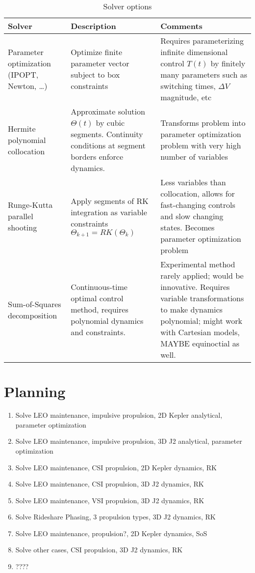 \begin{table}[htbp]
    \centering
    \begin{tabular}{>{\centering\arraybackslash}m{5cm}>{\centering\arraybackslash}m{5cm}>{\centering\arraybackslash}m{5cm}}\toprule
        \textbf{Solver} & \textbf{Description} & \textbf{Comments} \\ \midrule
        Parameter optimization (IPOPT, Newton, \dots) & Optimize finite parameter vector subject to box constraints & Requires parameterizing infinite dimensional control \(T(t)\) by finitely many parameters such as switching times, \(\Delta V\) magnitude, etc \\ \midrule
        Hermite polynomial collocation & Approximate solution \(\Theta(t)\) by cubic segments. Continuity conditions at segment borders enforce dynamics. & Transforms problem into parameter optimization problem with very high number of variables \\ \midrule
        Runge-Kutta parallel shooting & Apply segments of RK integration as variable constraints \(\Theta_{k+1} = RK(\Theta_k)\) & Less variables than collocation, allows for fast-changing controls and slow changing states. Becomes parameter optimization problem \\ \midrule
        Sum-of-Squares decomposition & Continuous-time optimal control method, requires polynomial dynamics and constraints. & Experimental method rarely applied; would be innovative. Requires variable transformations to make dynamics polynomial; might work with Cartesian models, MAYBE equinoctial as well. \\ \bottomrule
    \end{tabular}
    \caption{Solver options}\label{tab:solvers}
\end{table}

\section{Planning}

\begin{enumerate}
    \item Solve LEO maintenance, impulsive propulsion, 2D Kepler analytical, parameter optimization
    \item Solve LEO maintenance, impulsive propulsion, 3D J2 analytical, parameter optimization
    \item Solve LEO maintenance, CSI propulsion, 2D Kepler dynamics, RK
    \item Solve LEO maintenance, CSI propulsion, 3D J2 dynamics, RK
    \item Solve LEO maintenance, VSI propulsion, 3D J2 dynamics, RK
    \item Solve Rideshare Phasing, 3 propulsion types, 3D J2 dynamics, RK
    \item Solve LEO maintenance, propulsion?, 2D Kepler dynamics, SoS
    \item Solve other cases, CSI propulsion, 3D J2 dynamics, RK
    \item ????
\end{enumerate}

